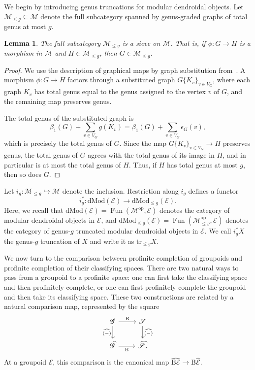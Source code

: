 \documentclass{amsart}
\newcommand{\bE}{\mathscr{E}}
\newcommand{\bM}{\mathscr{M}}
\newcommand{\sSet}{\mathscr{S}}
\newcommand{\Grpd}{\mathscr{G}}
\newcommand{\dMod}{\mathrm{dMod}}
\newcommand{\op}{\mathrm{op}}
\newcommand{\cs}{\mathrm{B}}
\newcommand{\trun}[1]{\mathrm{tr}_{\leq{#1}}}
\newtheorem{lemma}[theorem]{Lemma}%
\theoremstyle{definition}
\numberwithin{equation}{section}
\begin{document}
We begin by introducing genus truncations for modular dendroidal objects. Let $\bM_{\leq g}\subseteq \bM$ denote the full subcategory spanned by genus-graded graphs of total genus at most $g$.


\begin{lemma}
The full subcategory $\bM_{\leq g}$ is a sieve on $\bM$. That is, if $\phi\colon G\to H$ is a morphism in $\bM$ and $H\in\bM_{\leq g}$, then $G\in\bM_{\leq g}$.
\end{lemma}

\begin{proof}
We use the description of graphical maps by graph substitution from~\cite[Theorem~2.7]{hry1}. A morphism $\phi\colon G\to H$ factors through a substituted graph $G\{K_v\}_{v\in V_G}$, where each graph $K_v$ has total genus equal to the genus assigned to the vertex $v$ of $G$, and the remaining map preserves genus.

The total genus of the substituted graph is
\[
\beta_1(G)+\sum_{v\in V_G}g(K_v)
=
\beta_1(G)+\sum_{v\in V_G}\epsilon_G(v),
\]
which is precisely the total genus of $G$. Since the map $G\{K_v\}_{v\in V_G}\to H$ preserves genus, the total genus of $G$ agrees with the total genus of its image in $H$, and in particular is at most the total genus of $H$. Thus, if $H$ has total genus at most $g$, then so does $G$.
\end{proof}

Let $i_g\colon \bM_{\leq g}\hookrightarrow\bM$ denote the inclusion. Restriction along $i_g$ defines a functor
\[
i_g^*\colon \dMod(\bE)\longrightarrow \dMod_{\leq g}(\bE).
\]
Here, we recall that $\dMod(\bE)=\operatorname{Fun}(\bM^{\op},\bE)$ denotes the category of modular dendroidal objects in $\bE$, and $\dMod_{\leq g}(\bE)=\operatorname{Fun}(\bM_{\leq g}^{\op},\bE)$ denotes the category of genus-$g$ truncated modular dendroidal objects in $\bE$. We call $i_g^*X$ the genus-$g$ truncation of $X$ and write it as $\trun{g}X$.

We now turn to the comparison between profinite completion of groupoids and profinite completion of their classifying spaces. There are two natural ways to pass from a groupoid to a profinite space: one can first take the classifying space and then profinitely complete, or one can first profinitely complete the groupoid and then take its classifying space. These two constructions are related by a natural comparison map, represented by the square
\[
\begin{tikzcd}
\Grpd \arrow[r, "\cs"] \arrow[d, "\widehat{(-)}"'] &
\sSet \arrow[d, "\widehat{(-)}"] \\
\widehat{\Grpd} \arrow[r, "\cs"'] &
\widehat{\sSet}.
\end{tikzcd}
\]
At a groupoid $\mathscr E$, this comparison is the canonical map $\widehat{\cs\mathscr E}\to \cs\widehat{\mathscr E}$.
\end{document}

